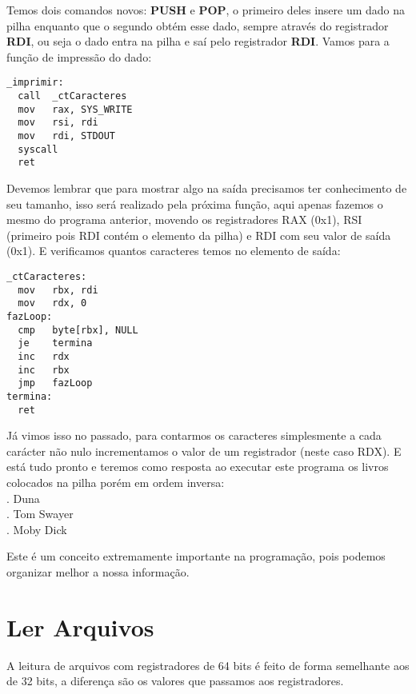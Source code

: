Temos dois comandos novos: \textbf{PUSH} e \textbf{POP}, o primeiro deles insere um dado na pilha enquanto que o segundo obtém esse dado, sempre através do registrador \textbf{RDI}, ou seja o dado entra na pilha e saí pelo registrador \textbf{RDI}. Vamos para a função de impressão do dado:
\begin{lstlisting}[]
_imprimir:
  call  _ctCaracteres
  mov   rax, SYS_WRITE
  mov   rsi, rdi
  mov   rdi, STDOUT
  syscall
  ret
\end{lstlisting}

Devemos lembrar que para mostrar algo na saída precisamos ter conhecimento de seu tamanho, isso será realizado pela próxima função, aqui apenas fazemos o mesmo do programa anterior, movendo os registradores RAX (0x1), RSI (primeiro pois RDI contém o elemento da pilha) e RDI com seu valor de saída (0x1). E verificamos quantos caracteres temos no elemento de saída:
\begin{lstlisting}[]
_ctCaracteres:
  mov   rbx, rdi
  mov   rdx, 0
fazLoop:
  cmp   byte[rbx], NULL
  je    termina
  inc   rdx
  inc   rbx
  jmp   fazLoop
termina:
  ret 
\end{lstlisting}

Já vimos isso no passado, para contarmos os caracteres simplesmente a cada carácter não nulo incrementamos o valor de um registrador (neste caso RDX). E está tudo pronto e teremos como resposta ao executar este programa os livros colocados na pilha porém em ordem inversa: \\
{. Duna} \\
{. Tom Swayer} \\
{. Moby Dick}

Este é um conceito extremamente importante na programação, pois podemos organizar melhor a nossa informação.

\section{Ler Arquivos}
A leitura de arquivos com registradores de 64 bits é feito de forma semelhante aos de 32 bits, a diferença são os valores que passamos aos registradores. 

